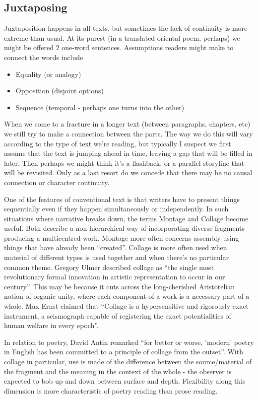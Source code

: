 \documentclass[11pt]{article}
\begin{document}
\newpage\subsection{Juxtaposing}
Juxtaposition happens in all texts, but sometimes the lack of continuity is more extreme than usual. At its purest (in a translated oriental poem, perhaps) we might be offered 2 one-word sentences. Assumptions readers might make to connect the words include
\begin{itemize}
\item Equality (or analogy)
\item Opposition (disjoint options)
\item Sequence (temporal - perhaps one turns into the other)
\end{itemize}
When we come to a fracture in a longer text (between paragraphs, chapters, etc) we still try to make a connection between the parts. The way we do this will vary according to the type of text we're reading, but typically I suspect we first assume that the text is jumping ahead in time, leaving a gap that will be filled in later. Then perhaps we might think it's a flashback, or a parallel storyline that will be revisited. Only as a last resort do we concede that there may be no causal connection or character continuity.

One of the features of conventional text is that writers have to present things sequentially even if they happen simultaneously or independently. In such situations where narrative breaks down, the terms Montage and Collage become useful. Both describe a non-hierarchical way of incorporating diverse fragments producing a multicentred work. Montage more often concerns assembly using things that have already been ``created''. Collage is more often used when material of different types is used together and when there's no particular common theme. Gregory Ulmer described collage as ``the single most revolutionary formal innovation in artistic representation to occur in our century''. This may be because it cuts across the long-cherished Aristotelian notion of organic unity, where each component of a work is a necessary part of a whole. Max Ernst claimed that ``Collage is a hypersensitive and rigorously exact instrument, a seismograph capable of registering the exact potentialities of human welfare in every epoch''.

In relation to poetry, David Antin remarked ``for better or worse, 'modern' poetry in English has been committed to a principle of collage from the outset''. With collage in particular, use is made of the difference between the source/material of the fragment and the meaning in the context of the whole - the observer is expected to bob up and down between surface and depth. Flexibility along this dimension is more characteristic of poetry reading than prose reading.
\end{document}
